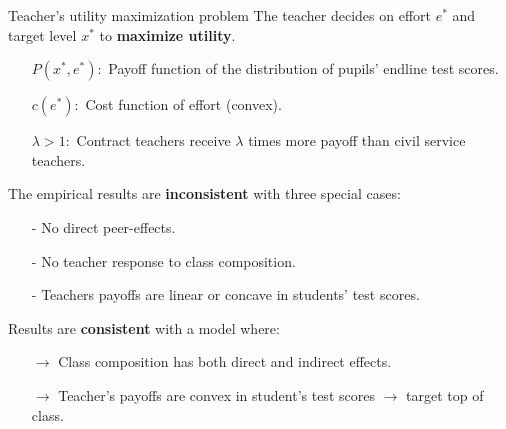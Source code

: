 \documentclass[9pt]{beamer}
\numberwithin{equation}{section}
\begin{document}
\begin{frame}{Teacher's utility maximization problem}
  The teacher decides on effort $e^{*}$ and target level $x^{*}$ to \textbf{maximize utility}.
  \begin{itemize}
    \item[$P(x^{*},e^{*}):$] Payoff function of the distribution of pupils' endline test scores.
    \item[$c(e^{*}):$] Cost function of effort (convex).
    \item[$\lambda>1:$] Contract teachers receive $\lambda$ times more payoff than civil service teachers.
  \end{itemize}
  The empirical results are \textbf{inconsistent} with three special cases:
  \begin{itemize}
    \item[-] No direct peer-effects.
    \item[-] No teacher response to class composition.
    \item[-] Teachers payoffs are linear or concave in students' test scores.
  \end{itemize}
  Results are \textbf{consistent} with a model where:
  \begin{itemize}
    \item[$\rightarrow$] Class composition has both direct and indirect effects.
    \item[$\rightarrow$] Teacher's payoffs are convex in student's test scores $\rightarrow$ target top of class.
  \end{itemize}
\end{frame}
\end{document}
